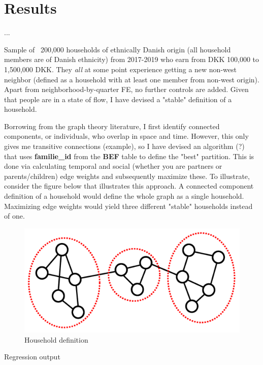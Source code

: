 \documentclass[../main.tex]{subfiles}
\begin{document}
\section{Results}
\label{sec:results}

...

Sample of ~200,000 households of ethnically Danish origin (all household members are of Danish ethnicity) from 2017-2019 who earn from DKK 100,000 to 1,500,000 DKK. They \textit{all} at some point experience getting a new non-west neighbor (defined as a household with at least one member from non-west origin). Apart from neighborhood-by-quarter FE, no further controls are added. Given that people are in a state of flow, I have devised a "stable" definition of a household.

Borrowing from the graph theory literature, I first identify connected components, or individuals, who overlap in space and time. However, this only gives me transitive connections (example), so I have devised an algorithm (?) that uses \textbf{familie\_id} from the \textbf{BEF} table to define the "best" partition. This is done via calculating temporal and social (whether you are partners or parents/children) edge weights and subsequently maximize these. To illustrate, consider the figure below that illustrates this approach. A connected component definition of a household would define the whole graph as a single household. Maximizing edge weights would yield three different "stable" households instead of one.


\begin{figure}[H]
    \centering
    \caption{Household definition}
    \includegraphics[width=0.4\linewidth]{figs/temporal_community_detection.png}
\end{figure}

\begin{table}[H]
    \caption{Regression output}
    \centering
    \resizebox{0.8\textwidth}{!}{}
    \label{tab:my_label}
\end{table}
\end{document}
